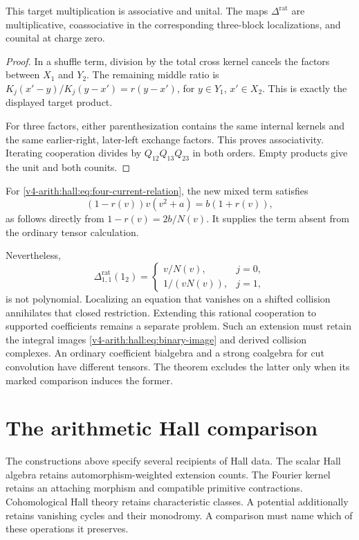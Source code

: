 \begin{proposition}\label{v4-arith:hall:prop:rational-coproduct}
This target multiplication is associative and unital.
The maps $\Delta^{\mathrm{rat}}$ are multiplicative,
coassociative in the corresponding three-block localizations,
and counital at charge zero.
\end{proposition}
\begin{proof}
In a shuffle term, division by the total cross kernel cancels
the factors between $X_1$ and $Y_2$. The remaining middle ratio is
$K_j(x'-y)/K_j(y-x')=r(y-x')$, for $y\in Y_1$, $x'\in X_2$.
This is exactly the displayed target product.

For three factors, either parenthesization contains the same
internal kernels and the same earlier-right, later-left exchange
factors. This proves associativity. Iterating cooperation divides
by $Q_{12}Q_{13}Q_{23}$ in both orders. Empty products give the
unit and both counits.
\end{proof}

For \eqref{v4-arith:hall:eq:four-current-relation}, the new mixed
term satisfies
\[
 (1-r(v))v(v^2+a)=b(1+r(v)),
\]
as follows directly from $1-r(v)=2b/N(v)$.
It supplies the term absent from the ordinary tensor calculation.


Nevertheless,
\[
 \Delta^{\mathrm{rat}}_{1,1}(1_2)=
 \begin{cases}v/N(v),&j=0,\\1/(vN(v)),&j=1,
 \end{cases}
\]
is not polynomial. Localizing an equation that vanishes on a
shifted collision annihilates that closed restriction.
Extending this rational cooperation to supported coefficients remains
a separate problem. Such an extension must retain the integral
images \eqref{v4-arith:hall:eq:binary-image} and derived collision complexes.
An ordinary coefficient bialgebra and a strong coalgebra
for cut convolution have different tensors. The theorem excludes
the latter only when its marked comparison induces the former.

\section{The arithmetic Hall comparison}
\label{v4-arith:hall:sec:arithmetic-comparison}

The constructions above specify several recipients of Hall data.
The scalar Hall algebra retains automorphism-weighted extension
counts. The Fourier kernel retains an attaching morphism and
compatible primitive contractions. Cohomological Hall theory retains
characteristic classes. A potential additionally retains vanishing
cycles and their monodromy. A comparison must name which of these
operations it preserves.


